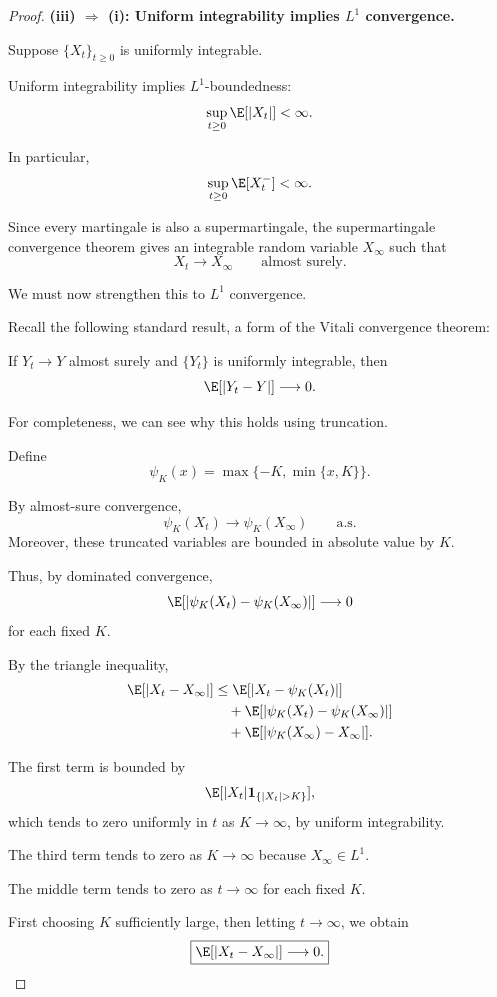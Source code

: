 \begin{proof}
\medskip
\noindent
\textbf{(iii) $\Rightarrow$ (i):
Uniform integrability implies $L^1$ convergence.}

Suppose $\{X_t\}_{t\geq0}$ is uniformly
integrable.

Uniform integrability implies $L^1$-boundedness:
\[
    \sup_{t\geq0}\E[|X_t|]<\infty.
\]

In particular,
\[
    \sup_{t\geq0}\E[X_t^-]<\infty.
\]

Since every martingale is also a supermartingale,
the supermartingale convergence theorem gives an
integrable random variable $X_\infty$ such that
\[
    X_t\longrightarrow X_\infty
    \qquad\text{almost surely}.
\]

We must now strengthen this to $L^1$ convergence.

Recall the following standard result, a form of
the Vitali convergence theorem:

If $Y_t\to Y$ almost surely and $\{Y_t\}$ is
uniformly integrable, then
\[
    \E[|Y_t-Y|]\longrightarrow0.
\]

For completeness, we can see why this holds using
truncation.

Define
\[
    \psi_K(x)=\max\{-K,\min\{x,K\}\}.
\]

By almost-sure convergence,
\[
    \psi_K(X_t)\to\psi_K(X_\infty)
    \qquad\text{a.s.}
\]
Moreover, these truncated variables are bounded
in absolute value by $K$.

Thus, by dominated convergence,
\[
    \E[|\psi_K(X_t)-\psi_K(X_\infty)|]
    \longrightarrow0
\]
for each fixed $K$.

By the triangle inequality,
\[
\begin{aligned}
    \E[|X_t-X_\infty|]
    &\leq
    \E[|X_t-\psi_K(X_t)|]\\
    &\quad+
    \E[|\psi_K(X_t)-\psi_K(X_\infty)|]\\
    &\quad+
    \E[|\psi_K(X_\infty)-X_\infty|].
\end{aligned}
\]

The first term is bounded by
\[
    \E[|X_t|\mathbf1_{\{|X_t|>K\}}],
\]
which tends to zero uniformly in $t$ as
$K\to\infty$, by uniform integrability.

The third term tends to zero as $K\to\infty$
because $X_\infty\in L^1$.

The middle term tends to zero as $t\to\infty$
for each fixed $K$.

First choosing $K$ sufficiently large, then
letting $t\to\infty$, we obtain
\[
    \boxed{
    \E[|X_t-X_\infty|]\longrightarrow0.
    }
\]


\end{proof}
